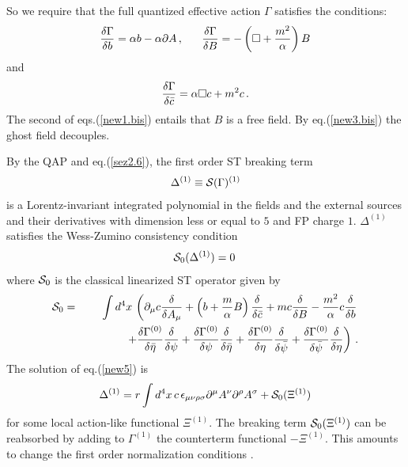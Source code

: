 \documentclass[a4paper,11pt]{article}
\def\G{\Gamma}
\begin{document}
So we require that the full quantized effective action $\G$ satisfies
the conditions:
%
\begin{eqnarray}
{\delta \G \over \delta b} = \alpha b - \alpha \partial A  \, , ~~~~~ 
{\delta \G \over \delta B} = - \left ( \square  + { m^2 \over \alpha} 
\right ) B 
\label{new1.bis}
\end{eqnarray}
%
and
\begin{eqnarray}
{\delta \G \over \delta \bar c} = \alpha \square c + m^2 c\, .
\label{new3.bis}
\end{eqnarray}
%
The second of eqs.(\ref{new1.bis}) entails that $B$ is a free field.
By eq.(\ref{new3.bis}) the ghost field decouples.

By the QAP and eq.(\ref{sez2.6}), the first order ST breaking term
%
\begin{eqnarray}
\Delta^{(1)} \equiv {\cal S}(\G)^{(1)}
\label{new4}
\end{eqnarray}
%
is a Lorentz-invariant integrated polynomial
in the fields and the external sources and their derivatives
with dimension less or equal to $5$ and FP charge $1$. 
$\Delta^{(1)}$ satisfies the Wess-Zumino consistency condition
%
\begin{eqnarray}
{\cal S}_0( \Delta^{(1)} ) = 0 \, 
\label{new5}
\end{eqnarray}
%
where ${\cal S}_0$ is the classical linearized ST operator given by
%
\begin{eqnarray}
{\cal S}_0 & = &
\int d^4x \, 
\left (
\partial_\mu c {\delta \over \delta A_\mu}
+ \left (b + {m \over \alpha} B \right )  {\delta  \over \delta \bar c}
+ mc {\delta \over \delta B} - {m^2 \over \alpha} c {\delta \over \delta b}
\right . 
\nonumber \\
&& ~~~~~~~~~~~
\left . 
+ {\delta \G^{(0)} \over \delta \bar \eta}
{\delta \over \delta \psi}
+  
{\delta \G^{(0)} \over \delta \psi} {\delta \over \delta \bar \eta} 
+ {\delta \G^{(0)} \over \delta \eta} 
{\delta \over \delta \bar \psi}
+ 
{\delta \G^{(0)} \over \delta \bar \psi} {\delta \over \delta \eta} 
\right )  \, .
\label{z4bis}
\end{eqnarray}
%
The solution of eq.(\ref{new5}) is \cite{anomalies}
%
\begin{eqnarray}
\Delta^{(1)} = r
 \int d^4x  \, c \, 
\epsilon_{\mu \nu \rho \sigma} \partial^\mu A^\nu 
\partial^\rho A^\sigma + {\cal S}_0 (\Xi^{(1)}) 
\label{new6}
\end{eqnarray}
%
for some local action-like functional  $\Xi^{(1)}$. 
The breaking term ${\cal S}_0 (\Xi^{(1)})$ can be reabsorbed by adding
to $\G^{(1)}$ the counterterm functional $-\Xi^{(1)}$. This amounts
to change the first order normalization conditions \cite{FGQ}.
\end{document}

